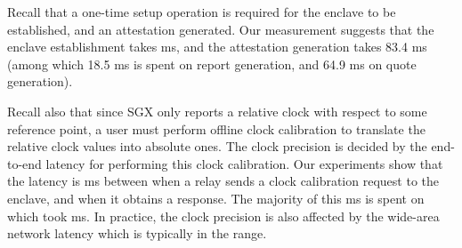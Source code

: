 
Recall that a one-time setup operation is required 
for the enclave to be established, and an attestation generated. 
Our measurement suggests that the enclave establishment takes
 ms, 
and the attestation generation takes 
83.4 ms (among which 
18.5 ms is spent 
on report generation, 
and 64.9 ms on quote generation).

Recall also that since SGX only reports a relative clock
with respect to some reference point,  
a user must perform offline clock calibration 
to translate the  relative clock values into absolute ones.
The clock precision is decided
by the end-to-end latency for performing 
this clock calibration. 
Our experiments show that the latency is  ms 
between when a relay sends a clock calibration request
to the enclave, and when it obtains a response.
The majority of this  ms is spent on
which took  ms.
In practice, the clock precision is also affected
by the wide-area network latency
which is typically in the  range.

%
%
%
%
%
